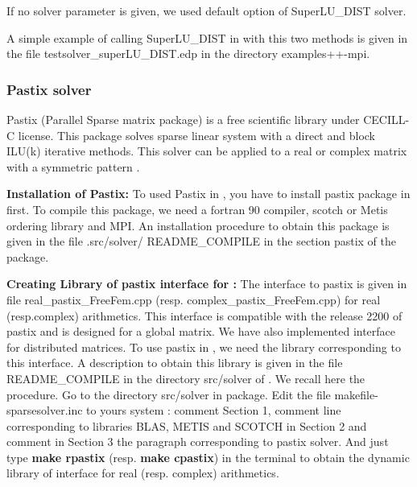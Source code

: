 \documentclass[a4paper,twoside,12pt]{book}
\begin{document}
If no solver parameter is given, we used default option of SuperLU\_DIST  solver.

\begin{example}
A simple example of calling SuperLU\_DIST in \freefempp with this two methods is given in the file testsolver\_superLU\_DIST.edp in the directory examples++-mpi.
\end{example}

\subsubsection{Pastix solver}
\label{sectionpastix}

Pastix (Parallel Sparse matrix package) is a free scientific library under CECILL-C license. This package solves sparse linear system with a direct and block ILU(k) iterative methods. This solver can be applied to a real or complex matrix with a symmetric pattern \cite{pastix}.

\begin{paragraph}
{\bf{Installation of Pastix:}}
To used Pastix in \freefempp, you have to install pastix package in first. To compile this package, we need a fortran 90 compiler, scotch \cite{scotch} or Metis \cite{metis}
ordering library and MPI. An installation procedure to obtain this package is given in the file .src/solver/ README\_COMPILE in the section pastix of the \freefempp package.
\end{paragraph}

\begin{paragraph}
{\bf{Creating Library of pastix interface for \freefempp:}}
The \freefempp interface to pastix is given in file real\_pastix\_FreeFem.cpp (resp. complex\_pastix\_FreeFem.cpp) for real (resp.complex) arithmetics. This interface is compatible with the release 2200 of pastix and is designed for a global matrix. We have also implemented interface for distributed matrices.   To use pastix in \freefempp, we need the library corresponding
to this interface. A description to obtain this library is given in the file README\_COMPILE in the directory src/solver of \freefempp. We recall here the procedure. Go to the
directory src/solver in \freefempp package. Edit the file makefile-sparsesolver.inc to yours system : comment Section 1, comment line corresponding to libraries BLAS, METIS and
SCOTCH in Section 2 and comment in Section 3 the paragraph corresponding to pastix solver. And just type {\bf{make rpastix}} (resp. {\bf{make cpastix}}) in the terminal to obtain the dynamic library of interface for real (resp. complex) arithmetics.
\end{paragraph}
\end{document}
